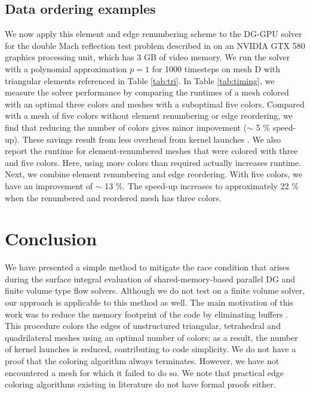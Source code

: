 \documentclass[12pt]{article}
\begin{document}
	
	\subsection{Data ordering examples}
	We now apply this element and edge renumbering scheme to the DG-GPU solver for the double Mach reflection test problem described in \cite{giuliani} on an NVIDIA GTX 580 graphics processing unit, which has 3 GB of video memory.  We run the solver with a polynomial approximation $p = 1$ for 1000 timesteps on mesh D with triangular elements referenced in Table \ref{tab:tri}.  In Table \ref{tab:timing}, we measure the solver performance by comparing the runtimes of a mesh colored with an optimal three colors and meshes with a suboptimal five colors.  Compared with a mesh of five colors without element renumbering or edge reordering, we find that reducing the number of colors gives minor impovement ($\sim$ 5 \% speed-up).  These savings result from less overhead from kernel launches \cite{luo}.  We also report the runtime for element-renumbered meshes that were colored with three and five colors.  Here, using more colors than required actually increases runtime.  Next, we combine element renumbering and edge reordering. With five colors, we have an improvement of $\sim$ 13 \%.  The speed-up increases to approximately 22 \% when the renumbered and reordered mesh has three colors.
	

	
	\section{Conclusion}
We have presented a simple method to mitigate the race condition that arises during the surface integral evaluation of shared-memory-based parallel DG and finite volume type flow solvers.  Although we do not test on a finite volume solver, our approach is applicable to this method as well.  The main motivation of this work was to reduce the memory footprint of the code by eliminating buffers \cite{giuliani, nodaldg, corrigan}.  This procedure colors the edges of unstructured triangular, tetrahedral and quadrilateral meshes using an optimal number of colors; as a result, the number of kernel launches is reduced, contributing to code simplicity.  We do not have a proof that the coloring algorithm always terminates.  However, we have not encountered a mesh for which it failed to do so.  We note that practical edge coloring algorithms existing in literature \cite{complexcolors, fiol2012} do not have formal proofs either.
\end{document}
